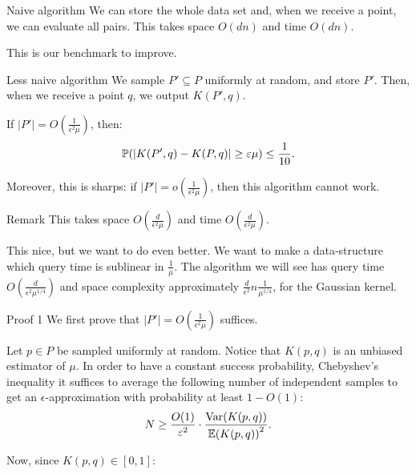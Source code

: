 \documentclass[a4paper]{article}
\begin{document}
\begin{parag}{Naive algorithm}
    We can store the whole data set and, when we receive a point, we can evaluate all pairs. This takes space $O\left(dn\right)$ and time $O\left(dn\right)$. 

    This is our benchmark to improve.
\end{parag}

\begin{parag}{Less naive algorithm}
    We sample $P' \subseteq P$ uniformly at random, and store $P'$. Then, when we receive a point $q$, we output $K\left(P', q\right)$.

    If $\left|P'\right| = O\left(\frac{1}{\epsilon^2 \mu}\right)$, then:
    \[\prob\left(\left|K\left(P', q\right) - K\left(P, q\right)\right| \geq \epsilon \mu\right) \leq \frac{1}{10}.\]

    Moreover, this is sharps: if $\left|P'\right| = o\left(\frac{1}{\epsilon^2 \mu}\right)$, then this algorithm cannot work.

    \begin{subparag}{Remark}
        This takes space $O\left(\frac{d}{\epsilon^2 \mu}\right)$ and time $O\left(\frac{d}{\epsilon^2 \mu}\right)$.

        This nice, but we want to do even better. We want to make a data-structure which query time is sublinear in $\frac{1}{\mu}$. The algorithm we will see has query time $O\left(\frac{d}{\epsilon^2 \mu^{1/4}}\right)$ and space complexity approximately $\frac{d}{\epsilon^2} n \frac{1}{\mu^{1/4}}$, for the Gaussian kernel.
    \end{subparag}
    
    \begin{subparag}{Proof 1}
        We first prove that $\left|P'\right| = O\left(\frac{1}{\epsilon^2 \mu}\right)$ suffices.

        Let $p \in P$ be sampled uniformly at random. Notice that $K\left(p, q\right)$ is an unbiased estimator of $\mu$. In order to have a constant success probability, Chebyshev's inequality it suffices to average the following number of independent samples to get an $\epsilon$-approximation with probability at least $1 - O\left(1\right)$: 
        \[N \geq \frac{O\left(1\right)}{\epsilon^2}\cdot \frac{\Var\left(K\left(p, q\right)\right)}{\exval\left(K\left(p, q\right)\right)^2}.\]
        
        Now, since $K\left(p, q\right) \in \left[0, 1\right]$: 
        

\end{subparag}
\end{parag}
\end{document}
